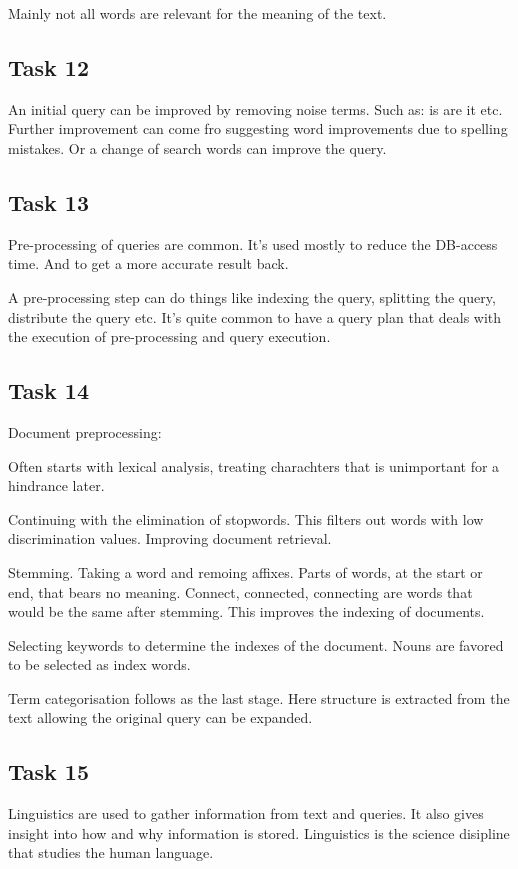 \documentclass[12pt, a4paper]{article}
\begin{document}
Mainly not all words are relevant for the meaning of the text. 

\subsection{Task 12}
An initial query can be improved by removing noise terms. Such as: is are it etc.
Further improvement can come fro suggesting word improvements due to spelling mistakes. 
Or a change of search words can improve the query. 

\subsection{Task 13}
Pre-processing of queries are common. It's used mostly to reduce the DB-access time.
And to get a more accurate result back. 

A pre-processing step can do things like indexing the query, splitting the query, distribute the query etc. 
It's quite common to have a query plan that deals with the execution of pre-processing and query execution. 

\subsection{Task 14}
Document preprocessing: 

Often starts with lexical analysis, treating charachters that is unimportant for a hindrance later. 

Continuing with the elimination of stopwords. This filters out words with low discrimination values. Improving document retrieval. 

Stemming. Taking a word and remoing affixes. Parts of words, at the start or end, that bears no meaning. 
Connect, connected, connecting are words that would be the same after stemming. This improves the indexing of documents.

Selecting keywords to determine the indexes of the document. Nouns are favored to be selected as index words. 

Term categorisation follows as the last stage. Here structure is extracted from the text allowing the original query can be expanded.

\subsection{Task 15}
Linguistics are used to gather information from text and queries. 
It also gives insight into how and why information is stored. 
Linguistics is the science disipline that studies the human language.
\end{document}
